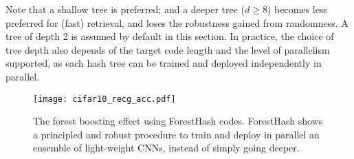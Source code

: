 \documentclass[runningheads]{llncs}
\begin{document}
Note that a shallow tree is preferred; and a deeper tree ($d \ge 8$) becomes
less preferred for (fast) retrieval, and loses the robustness gained from
randomness. A tree of depth 2 is assumed by default in this section.  In
practice, the choice of tree depth also depends of the target code length and
the level of parallelism supported, as each hash tree can be trained and
deployed independently in parallel.

      
\begin{table*}[ht]
  \caption{Mean average precision (mAP  in \%) in percent of Hamming ranking  on MNIST.
  }
  \label{tab:mnist_map}
\end{table*}


\begin{figure}[t]
  \centering
  \texttt{[image: cifar10\_recg\_acc.pdf]}
  \caption{The forest boosting effect using ForestHash codes.  ForestHash shows
    a principled and robust procedure to train and deploy in parallel an
    ensemble of light-weight CNNs, instead of simply going deeper. }
  \label{fig:forestboost}
\end{figure}


\begin{table*}[ht]
  \caption{Cross-modality image retrieval using text queries on the Wiki dataset
    (mAP in \%).}
  \label{tab:wiki}
\end{table*}
     
\end{document}
